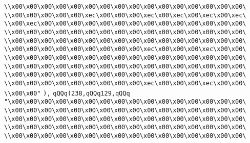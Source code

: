 \verb|\\x00\x00\x00\x00\x00\x00\x00\x00\x00\x00\x00\x00\x00\x00\x00\x00\|\newline
\verb|\\x00\x00\x00\x00\x00\xec\x00\x00\x00\xec\x00\xec\x00\xec\x00\xec\|\newline
\verb|\\x00\xec\x00\x00\x00\x00\x00\x00\x00\x00\x00\x00\x00\x00\x00\x00\|\newline
\verb|\\x00\x00\x00\x00\x00\x00\x00\x00\x00\x00\x00\x00\x00\x00\x00\x00\|\newline
\verb|\\x00\x00\x00\x00\x00\x00\x00\x00\x00\x00\x00\x00\x00\x00\x00\x00\|\newline
\verb|\\x00\x00\x00\x00\x00\x00\x00\x00\x00\xec\x00\x00\x00\xec\x00\x00\|\newline
\verb|\\x00\x00\x00\x00\x00\x00\x00\x00\x00\x00\x00\x00\x00\x00\x00\x00\|\newline
\verb|\\x00\x00\x00\x00\x00\x00\x00\x00\x00\x00\x00\x00\x00\x00\x00\x00\|\newline
\verb|\\x00\x00\x00\x00\x00\x00\x00\x00\x00\x00\x00\x00\x00\x00\x00\x00\|\newline
\verb|\\x00\x00\x00\x00\x00\x00\x00\x00\x00\xec\x00\x00\x00\xec\x00\x00\|\newline
\verb|\\x00\x00"|\newline
\verb|),|\newline
\verb|qQQq(238,qQQq129,qQQq|\newline
\verb|"\x00\x00\x00\x00\x00\x00\x00\x00\x00\x00\x00\x00\x00\x00\x00\x00\|\newline
\verb|\\x00\x00\x00\x00\x00\x00\x00\x00\x00\x00\x00\x00\x00\x00\x00\x00\|\newline
\verb|\\x00\x00\x00\x00\x00\x00\x00\x00\x00\x00\x00\x00\x00\x00\x00\x00\|\newline
\verb|\\x00\x00\x00\x00\x00\x00\x00\x00\x00\x00\x00\x00\x00\x00\x00\x00\|\newline
\verb|\\x00\x00\x00\x00\x00\x00\x00\x00\x00\x00\x00\x00\x00\x00\x00\x00\|\newline

